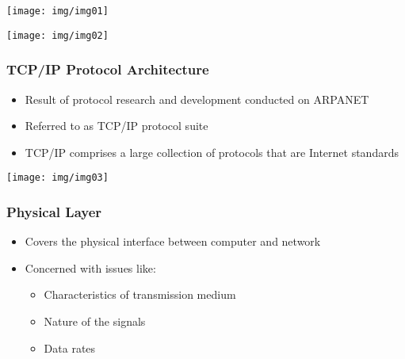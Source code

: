 \documentclass[pdflatex,compress]{beamer}
\begin{document}
\begin{frame}
	\begin{center}
		\texttt{[image: img/img01]}
	\end{center}
\end{frame}

\begin{frame}
	\begin{center}
		\texttt{[image: img/img02]}
	\end{center}
\end{frame}

\begin{frame}
	\frametitle{TCP/IP Protocol Architecture}
	\begin{itemize}
		\item Result of protocol research and development conducted on ARPANET
		\item Referred to as TCP/IP protocol suite
		\item TCP/IP comprises a large collection of protocols that are Internet standards
	\end{itemize}
\end{frame}

\begin{frame}
	\begin{center}
		\texttt{[image: img/img03]}
	\end{center}
\end{frame}

\begin{frame}
	\frametitle{Physical Layer}
	\begin{itemize}
		\item Covers the physical interface between computer and network
		\item Concerned with issues like:
		\begin{itemize}
			\item Characteristics of transmission medium
			\item Nature of the signals
			\item Data rates
		\end{itemize}
	\end{itemize}
\end{frame}
\end{document}
